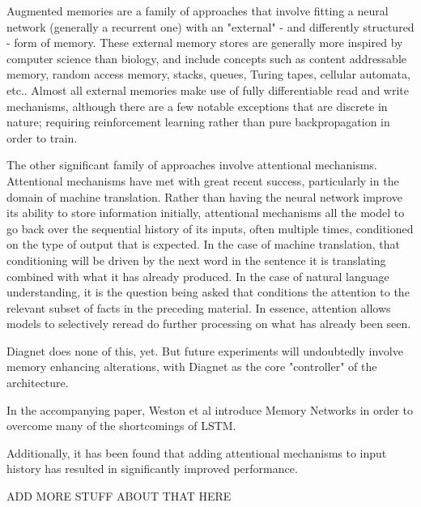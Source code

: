\documentclass{article}
\begin{document}
Augmented memories are a family of approaches that involve fitting a neural network (generally a recurrent one) with an "external" - and differently structured - form of memory. These external memory stores are generally more inspired by computer science than biology, and include concepts such as content addressable memory, random access memory, stacks, queues, Turing tapes, cellular automata, etc.. Almost all external memories make use of fully differentiable read and write mechanisms, although there are a few notable exceptions that are discrete in nature; requiring reinforcement learning rather than pure backpropagation in order to train.

The other significant family of approaches involve attentional mechanisms. Attentional mechanisms have met with great recent success, particularly in the domain of machine translation. Rather than having the neural network improve its ability to store information initially, attentional mechanisms all the model to go back over the sequential history of its inputs, often multiple times, conditioned on the type of output that is expected. In the case of machine translation, that conditioning will be driven by the next word in the sentence it is translating combined with what it has already produced. In the case of natural language understanding, it is the question being asked that conditions the attention to the relevant subset of facts in the preceding material. In essence, attention allows models to selectively reread do further processing on what has already been seen.

Diagnet does none of this, yet. But future experiments will undoubtedly involve memory enhancing alterations, with Diagnet as the core "controller" of the architecture. 





In the accompanying paper, Weston et al introduce Memory Networks in order to overcome many of the shortcomings of LSTM. 

Additionally, it has been found that adding attentional mechanisms to input history has resulted in significantly improved performance.

ADD MORE STUFF ABOUT THAT HERE
\end{document}
